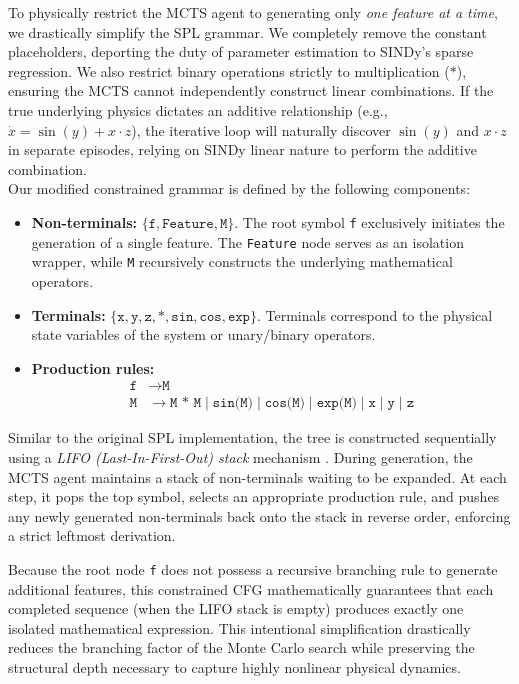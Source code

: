 \documentclass[11pt, a4paper]{article}
\begin{document}
To physically restrict the MCTS agent to generating only \textit{one feature at a time}, we drastically simplify the SPL grammar. We completely remove the constant placeholders, deporting the duty of parameter estimation to SINDy's sparse regression. We also restrict binary operations strictly to multiplication ($*$), ensuring the MCTS cannot independently construct linear combinations. If the true underlying physics dictates an additive relationship (e.g., $\dot{x} = \sin(y) + x \cdot z$), the iterative loop will naturally discover $\sin(y)$ and $x \cdot z$ in separate episodes, relying on SINDy linear nature to perform the additive combination.\\

Our modified constrained grammar is defined by the following components:
\begin{itemize}
    \item \textbf{Non-terminals:} $\{\texttt{f}, \texttt{Feature}, \texttt{M}\}$. The root symbol \texttt{f} exclusively initiates the generation of a single feature. The \texttt{Feature} node serves as an isolation wrapper, while \texttt{M} recursively constructs the underlying mathematical operators.
    \item \textbf{Terminals:} $\{\texttt{x}, \texttt{y}, \texttt{z}, \texttt{*}, \texttt{sin}, \texttt{cos}, \texttt{exp}\}$. Terminals correspond to the physical state variables of the system or unary/binary operators.
    \item \textbf{Production rules:}
    \begin{align*}
        \texttt{f} &\rightarrow \texttt{M} \\
        \texttt{M} &\rightarrow \texttt{M * M} \mid \texttt{sin(M)} \mid \texttt{cos(M)} \mid \texttt{exp(M)} \mid \texttt{x} \mid \texttt{y} \mid \texttt{z}
    \end{align*}
\end{itemize}

Similar to the original SPL implementation, the tree is constructed sequentially using a \textit{LIFO (Last-In-First-Out) stack} mechanism \cite{sun2023spl}. During generation, the MCTS agent maintains a stack of non-terminals waiting to be expanded. At each step, it pops the top symbol, selects an appropriate production rule, and pushes any newly generated non-terminals back onto the stack in reverse order, enforcing a strict leftmost derivation.

Because the root node \texttt{f} does not possess a recursive branching rule to generate additional features, this constrained CFG mathematically guarantees that each completed sequence (when the LIFO stack is empty) produces exactly one isolated mathematical expression. This intentional simplification drastically reduces the branching factor of the Monte Carlo search while preserving the structural depth necessary to capture highly nonlinear physical dynamics.
\end{document}
